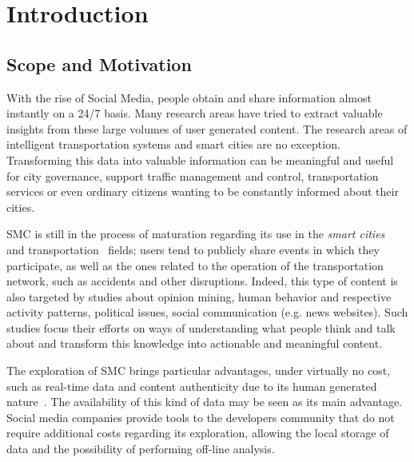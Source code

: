 \chapter{Introduction} \label{chap:intro}

\minitoc \mtcskip \noindent

\section{Scope and Motivation}\label{sec:scope_motivation}
With the rise of Social Media, people obtain and share information almost instantly on a 24/7 basis. Many research areas have tried to extract valuable insights from these large volumes of user generated content. The research areas of intelligent transportation systems and smart cities are no exception. Transforming this data into valuable information can be meaningful and useful for city governance, support traffic management and control, transportation services or even ordinary citizens wanting to be constantly informed about their cities. 

\gls{SMC} is still in the process of maturation regarding its use in the \textit{smart cities}~\cite{batty2012smart} and transportation~\cite{gal2014potential} fields; users tend to publicly share events in which they participate, as well as the ones related to the operation of the transportation network, such as accidents and other disruptions. Indeed, this type of content is also targeted by studies about opinion mining, human behavior and respective activity patterns, political issues, social communication (e.g. news websites). Such studies focus their efforts on ways of understanding what people think and talk about and transform this knowledge into actionable and meaningful content. 

The exploration of \gls{SMC} brings particular advantages, under virtually no cost, such as real-time data and content authenticity due to its human generated nature~\cite{kuflik2017automating}. The availability of this kind of data may be seen as its main advantage. Social media companies provide tools to the developers community that do not require additional costs regarding its exploration, allowing the local storage of data and the possibility of performing off-line analysis.

